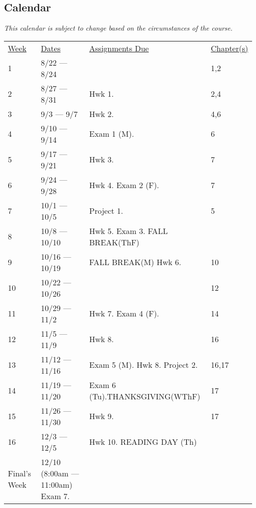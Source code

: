 \documentclass[10pt]{article}
\begin{document}
\subsection{Calendar}

\textit{This calendar is subject to change based on the circumstances of the course.}

\begin{center}
\begin{tabular}{llll}
\underline{Week} & \underline{Dates} & \underline{Assignments Due} & \underline{Chapter(s)}\\
1 & 8/22 --- 8/24 &  & 1,2 \\
2 & 8/27 --- 8/31 & Hwk 1. & 2,4  \\
3 & 9/3 --- 9/7 & Hwk 2. &  4,6 \\
4 & 9/10 --- 9/14 & Exam 1 (M). &  6 \\
5 & 9/17 --- 9/21 & Hwk 3. & 7 \\
6 & 9/24 --- 9/28 & Hwk 4. Exam 2 (F). & 7  \\
7 & 10/1 --- 10/5 & Project 1. &  5 \\
8 & 10/8 --- 10/10 & Hwk 5. Exam 3. FALL BREAK(ThF) &  \\
9 & 10/16 --- 10/19 & FALL BREAK(M) Hwk 6. & 10 \\
10 & 10/22 --- 10/26 &  & 12 \\
11 & 10/29 --- 11/2 & Hwk 7. Exam 4 (F). & 14  \\
12 & 11/5 --- 11/9 & Hwk 8.  &  16 \\
13 & 11/12 --- 11/16 & Exam 5 (M). Hwk 8. Project 2. & 16,17  \\
14 & 11/19 --- 11/20 & Exam 6 (Tu).THANKSGIVING(WThF) & 17 \\
15 & 11/26 --- 11/30 & Hwk 9.  & 17 \\
16 & 12/3 --- 12/5 & Hwk 10.  READING DAY (Th) & \\
Final's Week & 12/10 (8:00am --- 11:00am) Exam 7. & \\
\end{tabular}
\end{center}
\end{document}
